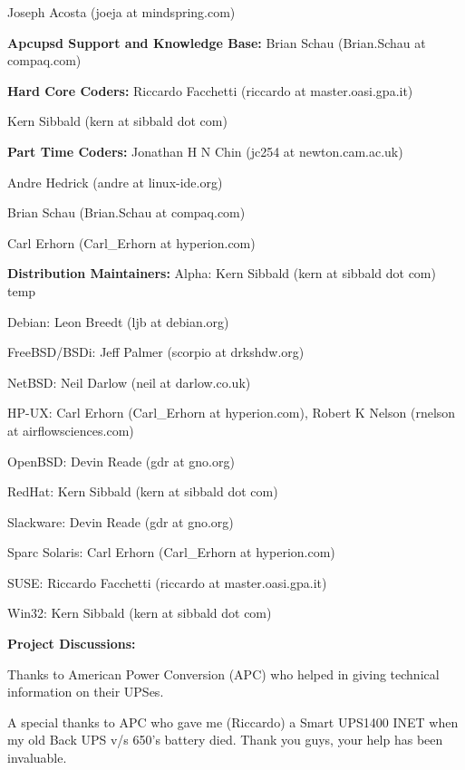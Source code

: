 {{{{{{{{{{{{{{{{{\begin{description}
Joseph Acosta (joeja at mindspring.com)  

\item {\bf Apcupsd Support and Knowledge Base:}
Brian Schau (Brian.Schau at compaq.com)  

\item {\bf Hard Core Coders:}
Riccardo Facchetti (riccardo at master.oasi.gpa.it)  

Kern Sibbald (kern at sibbald dot com)  

\item {\bf Part Time Coders:}
Jonathan H N Chin (jc254 at newton.cam.ac.uk)  

Andre Hedrick (andre at linux-ide.org)  

Brian Schau (Brian.Schau at compaq.com)  

Carl Erhorn (Carl\_Erhorn at hyperion.com)  

\item {\bf Distribution Maintainers:}
Alpha: Kern Sibbald (kern at sibbald dot com) temp  

Debian: Leon Breedt (ljb at debian.org)  

FreeBSD/BSDi: Jeff Palmer (scorpio at drkshdw.org)  

NetBSD: Neil Darlow (neil at darlow.co.uk)  

HP-UX: Carl Erhorn (Carl\_Erhorn at hyperion.com), Robert K Nelson (rnelson at
airflowsciences.com)  

OpenBSD: Devin Reade (gdr at gno.org)  

RedHat: Kern Sibbald (kern at sibbald dot com)  

Slackware: Devin Reade (gdr at gno.org)  

Sparc Solaris: Carl Erhorn (Carl\_Erhorn at hyperion.com)  

SUSE: Riccardo Facchetti (riccardo at master.oasi.gpa.it)  

Win32: Kern Sibbald (kern at sibbald dot com)  

\item {\bf Project Discussions:}
\end{description}

Thanks to American Power Conversion (APC) who helped in giving technical
information on their UPSes.  

A special thanks to APC who gave me (Riccardo) a Smart UPS1400 INET when my
old Back UPS v/s 650's battery died.  Thank you guys, your help has been
invaluable.  

}}}}}}}}}}}}}}}}}
